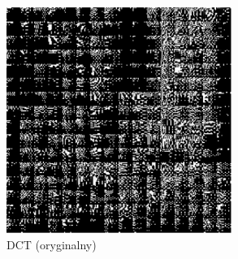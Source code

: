 \documentclass[a4paper,12pt]{article}
\begin{document}
\begin{figure}[h]
            \vspace{1em}
            \begin{subfigure}{0.3\textwidth}
                \hspace*{\fill} %
            \end{subfigure}
            \hfill
            \begin{subfigure}{0.3\textwidth}
                \centering
                \includegraphics[width=\textwidth]{img/dct_cover.png}
                \caption{DCT (oryginalny)}
            \end{subfigure}
            \hfill
            \begin{subfigure}{0.3\textwidth}
                \centering

\end{subfigure}
\end{figure}
\end{document}
